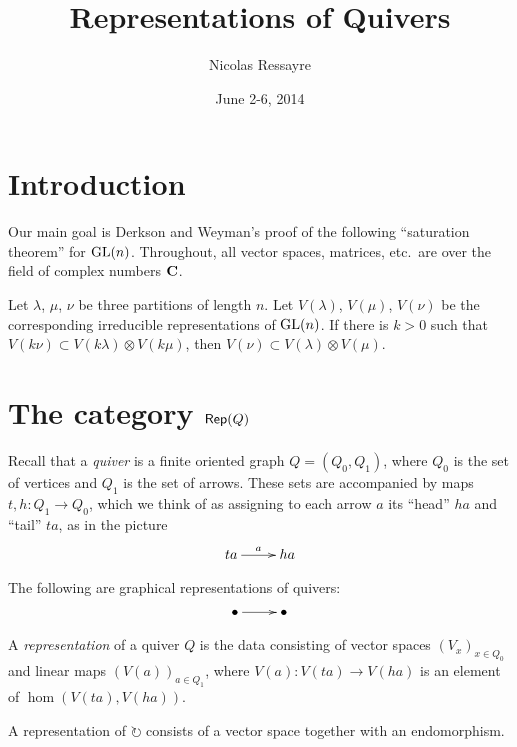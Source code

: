 \documentclass{article}
\title{Representations of Quivers}
\author{Nicolas Ressayre}
\date{June 2-6, 2014}
\begin{document}
\maketitle
\tableofcontents





\section{Introduction}

Our main goal is Derkson and Weyman's proof of the following ``saturation 
theorem'' for $\operatorname{GL}(n)$. Throughout, all vector spaces, matrices, 
etc.\ are over the field of complex numbers $\mathbf{C}$. 

\begin{theorem}
Let $\lambda$, $\mu$, $\nu$ be three partitions of length $n$. Let 
$V(\lambda)$, $V(\mu)$, $V(\nu)$ be the corresponding irreducible 
representations of $\operatorname{GL}(n)$. If there is $k>0$ such that 
$V(k\nu)\subset V(k\lambda)\otimes V(k\mu)$, then 
$V(\nu)\subset V(\lambda)\otimes V(\mu)$. 
\end{theorem}





\section{The category \texorpdfstring{$\operatorname{\mathsf{Rep}}(Q)$}{Rep(Q)}}

Recall that a \emph{quiver} is a finite oriented graph $Q=(Q_0,Q_1)$, where 
$Q_0$ is the set of vertices and $Q_1$ is the set of arrows. These sets are 
accompanied by maps $t,h:Q_1 \to Q_0$, which we think of as assigning to each 
arrow $a$ its ``head'' $h a$ and ``tail'' $t a$, as in the picture 
\[\xymatrix{
  t a \ar[r]^-a 
    & h a
}\]

\begin{example}
The following are graphical representations of quivers: 
\[\xymatrix{
  \bullet \ar[r] 
    & \bullet
}\]
\end{example}

A \emph{representation} of a quiver $Q$ is the data consisting of vector 
spaces $(V_x)_{x\in Q_0}$ and linear maps $(V(a))_{a\in Q_1}$, where 
$V(a):V(t a)\to V(h a)$ is an element of 
$\hom(V(t a),V(h a))$. 

\begin{example}
A representation of $\circlearrowright$ consists of a vector space together 
with an endomorphism. 
\end{example}
\end{document}
